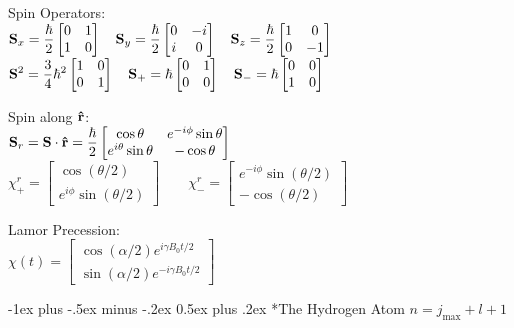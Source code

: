 \documentclass[12pt,landscape]{article}
\makeatletter
\renewcommand{\section}{\@startsection{section}{1}{0mm}%
                                {-1ex plus -.5ex minus -.2ex}%
                                {0.5ex plus .2ex}%
                                {\normalfont\normalsize\bfseries}}
\newcommand{\tab}{\hspace{.02\textwidth}}
\newcommand{\ds}{\displaystyle}
\makeatother
\begin{document}
\begin{multicols}{3}
Spin Operators:\\
\tab $\ds \vb{S}_x = \frac{\hbar}{2}\begin{bmatrix}0 & 1 \\ 1 & 0\end{bmatrix} \quad \vb{S}_y = \frac{\hbar}{2}\begin{bmatrix}0 & -i \\ i & 0 \end{bmatrix} \quad \vb{S}_z = \frac{\hbar}{2}\begin{bmatrix}1 & 0 \\ 0 & -1 \end{bmatrix}$\\
\tab $\ds \vb{S}^2 = \frac{3}{4}\hbar^2\begin{bmatrix}1 & 0 \\ 0 & 1\end{bmatrix} \quad \vb{S_+} = \hbar\begin{bmatrix}0 & 1 \\ 0 & 0 \end{bmatrix} \quad \vb{S_-} = \hbar\begin{bmatrix}0 & 0 \\ 1 & 0 \end{bmatrix}$

Spin along $\vu{r}$:\\
\tab $\ds \vb{S}_r = \vb{S} \cdot \vu{r} = \frac{\hbar}{2}\begin{bmatrix}\cos\theta & e^{-i\phi}\sin\theta \\ e^{i\theta}\sin\theta  & -\cos\theta\end{bmatrix}$\\
\tab $\ds \chi^r_+ = \begin{bmatrix}\cos(\theta/2) \\ e^{i\phi}\sin(\theta/2)\end{bmatrix} \qquad \chi^r_- = \begin{bmatrix} e^{-i\phi}\sin(\theta/2) \\ -\cos(\theta/2) \end{bmatrix}$

Lamor Precession:\\
\tab $\chi(t) = \begin{bmatrix}\cos(\alpha/2)e^{i\gamma B_0t/2} \\ \sin(\alpha/2)e^{-i\gamma B_0t/2}\end{bmatrix}$

\section*{The Hydrogen Atom}
$n = j_{\text{max}} + l +1$


\end{multicols}
\end{document}
